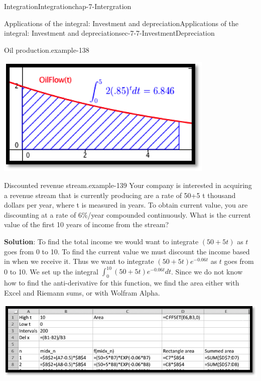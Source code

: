 \documentclass[oneside,10pt,]{book}
\newcommand{\terminology}[1]{\textbf{#1}}
\numberwithin{equation}{section}
\begin{document}
\begin{chapterptx}{Integration}{}{Integration}{}{}{chap-7-Intergration}
\begin{sectionptx}{Applications of the integral: Investment and depreciation}{}{Applications of the integral: Investment and depreciation}{}{}{sec-7-7-InvestmentDepreciation}
\begin{example}{Oil production.}{example-138}
\begin{sidebyside}{1}{0.3}{0.3}{0}%
\begin{sbspanel}{0.4}%
\includegraphics[width=1\linewidth]{images/sec7-7-3.png}
\end{sbspanel}%
\end{sidebyside}%
\end{example}
\begin{example}{Discounted revenue stream.}{example-139}%
\hypertarget{p-3016}{}%
Your company is interested in acquiring a revenue stream that is currently producing are a rate of 50+5 t  thousand dollars per year, where t is measured in years.  To obtain current value, you are discounting at a rate of 6\%\slash{}year compounded continuously.  What is the current value of the first 10 years of income from the stream?%
\par
\hypertarget{p-3017}{}%
\terminology{Solution}: To find the total income we would want to integrate \((50+5t)\) as \(t\) goes from 0 to 10.  To find the current value we must discount the income based in when we receive it.  Thus we want to integrate \((50+5t) e^{-0.06t}\) as \(t\) goes from 0 to 10.  We set up the integral \(\int_0^{10} (50+5t) e^{-0.06t}  dt\).  Since we do not know how to find the anti-derivative for this function, we find the area either with Excel and Riemann sums, or with Wolfram Alpha.%
\begin{sidebyside}{1}{0.1}{0.1}{0}%
\begin{sbspanel}{0.8}%
\includegraphics[width=1\linewidth]{images/sec7-7-4.png}

\end{sbspanel}
\end{sidebyside}
\end{example}
\end{sectionptx}
\end{chapterptx}
\end{document}
